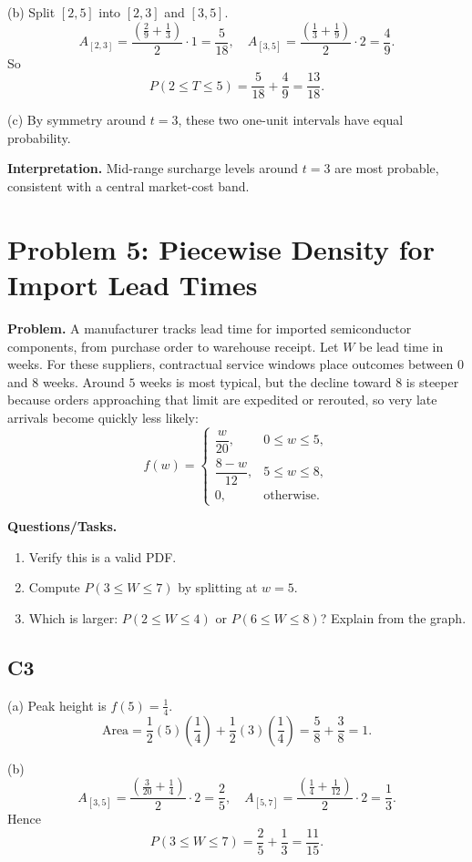 (b) Split $[2,5]$ into $[2,3]$ and $[3,5]$.
\[
A_{[2,3]}=\frac{\left(\frac29+\frac13\right)}{2}\cdot1=\frac{5}{18},
\quad
A_{[3,5]}=\frac{\left(\frac13+\frac19\right)}{2}\cdot2=\frac{4}{9}.
\]
So
\[
P(2\le T\le 5)=\frac{5}{18}+\frac{4}{9}=\frac{13}{18}.
\]

(c) By symmetry around $t=3$, these two one-unit intervals have equal probability.

\textbf{Interpretation.}
Mid-range surcharge levels around $t=3$ are most probable, consistent with a central market-cost band.

\section{Problem 5: Piecewise Density for Import Lead Times}

\textbf{Problem.}
A manufacturer tracks lead time for imported semiconductor components, from purchase order to warehouse receipt. Let $W$ be lead time in weeks. For these suppliers, contractual service windows place outcomes between $0$ and $8$ weeks. Around $5$ weeks is most typical, but the decline toward $8$ is steeper because orders approaching that limit are expedited or rerouted, so very late arrivals become quickly less likely:
\[
f(w)=\begin{cases}
\dfrac{w}{20}, & 0\le w\le 5,\\
\dfrac{8-w}{12}, & 5\le w\le 8,\\
0, & \text{otherwise.}
\end{cases}
\]

\textbf{Questions/Tasks.}
\begin{enumerate}[label=(\alph*)]
\item Verify this is a valid PDF.
\item Compute $P(3\le W\le 7)$ by splitting at $w=5$.
\item Which is larger: $P(2\le W\le 4)$ or $P(6\le W\le 8)$? Explain from the graph.
\end{enumerate}

\subsection*{C3}
(a) Peak height is $f(5)=\frac14$.
\[
\text{Area}=\frac12(5)\left(\frac14\right)+\frac12(3)\left(\frac14\right)=\frac58+\frac38=1.
\]

(b)
\[
A_{[3,5]}=\frac{\left(\frac3{20}+\frac14\right)}{2}\cdot2=\frac25,
\quad
A_{[5,7]}=\frac{\left(\frac14+\frac1{12}\right)}{2}\cdot2=\frac13.
\]
Hence
\[
P(3\le W\le 7)=\frac25+\frac13=\frac{11}{15}.
\]

